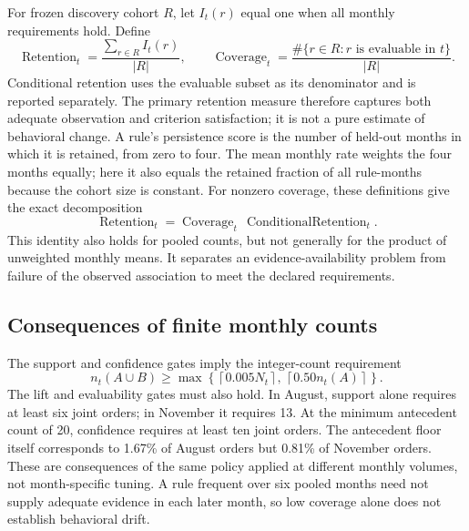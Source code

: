 For frozen discovery cohort $R$, let $I_t(r)$ equal one when all monthly requirements hold. Define
\begin{equation}
\operatorname{Retention}_t=\frac{\sum_{r\in R}I_t(r)}{|R|},\qquad
\operatorname{Coverage}_t=\frac{\#\{r\in R:r\text{ is evaluable in }t\}}{|R|}.
\end{equation}
Conditional retention uses the evaluable subset as its denominator and is reported separately. The primary retention measure therefore captures both adequate observation and criterion satisfaction; it is not a pure estimate of behavioral change. A rule's persistence score is the number of held-out months in which it is retained, from zero to four. The mean monthly rate weights the four months equally; here it also equals the retained fraction of all rule-months because the cohort size is constant.
For nonzero coverage, these definitions give the exact decomposition
\begin{equation}
\operatorname{Retention}_t
=\operatorname{Coverage}_t\,
\operatorname{ConditionalRetention}_t.
\label{eq:decomposition}
\end{equation}
This identity also holds for pooled counts, but not generally for the product of unweighted monthly means. It separates an evidence-availability problem from failure of the observed association to meet the declared requirements.

\subsection{Consequences of finite monthly counts}
The support and confidence gates imply the integer-count requirement
\begin{equation}
n_t(A\cup B)\geq
\max\!\left\{\left\lceil0.005N_t\right\rceil,\,
\left\lceil0.50n_t(A)\right\rceil\right\}.
\end{equation}
The lift and evaluability gates must also hold. In August, support alone requires at least six joint orders; in November it requires 13. At the minimum antecedent count of 20, confidence requires at least ten joint orders. The antecedent floor itself corresponds to 1.67\% of August orders but 0.81\% of November orders. These are consequences of the same policy applied at different monthly volumes, not month-specific tuning. A rule frequent over six pooled months need not supply adequate evidence in each later month, so low coverage alone does not establish behavioral drift.

